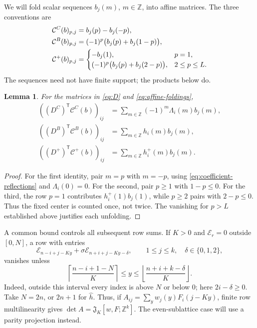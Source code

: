 \documentclass[12pt]{article}
\newtheorem{lemma}[theorem]{Lemma}
\numberwithin{equation}{section}
\newcommand{\Z}{\mathbb Z}
\newcommand{\Jaff}{\mathfrak J}
\begin{document}
We will fold scalar sequences $b_j(m)$, $m\in\Z$, into affine
matrices.  The three conventions are
\begin{align}
 \mathcal C^C(b)_{p,j}&=b_j(p)-b_j(-p),\notag\\
 \mathcal C^B(b)_{p,j}&=(-1)^p\bigl(b_j(p)+b_j(1-p)\bigr),
 \label{eq:affine-foldings}\\
 \mathcal C^+(b)_{p,j}&=
 \begin{cases}
 -b_j(1),&p=1,\\
 (-1)^p\bigl(b_j(p)+b_j(2-p)\bigr),&2\le p\le L.
 \end{cases}\notag
\end{align}
The sequences need not have finite support; the products below do.

\begin{lemma}
For the matrices in \eqref{eq:D} and \eqref{eq:affine-foldings},
\begin{align}
 ((D^C)^{\mathsf T}\mathcal C^C(b))_{ij}
 &=\sum_{m\in\Z}(-1)^m\Lambda_i(m)b_j(m),\label{eq:pairing-C}\\
 ((D^B)^{\mathsf T}\mathcal C^B(b))_{ij}
 &=\sum_{m\in\Z}h_i(m)b_j(m),\label{eq:pairing-B}\\
 ((D^+)^{\mathsf T}\mathcal C^+(b))_{ij}
 &=\sum_{m\in\Z}h_i^+(m)b_j(m).\label{eq:pairing-plus}
\end{align}
\end{lemma}

\begin{proof}
For the first identity, pair $m=p$ with $m=-p$, using
\eqref{eq:coefficient-reflections} and $\Lambda_i(0)=0$.
For the second, pair $p\ge1$ with $1-p\le0$.
For the third, the row $p=1$ contributes $h_i^+(1)b_j(1)$, while
$p\ge2$ pairs with $2-p\le0$.  Thus the fixed center is counted
once, not twice.  The vanishing for $p>L$ established above justifies
each unfolding.
\end{proof}

A common bound controls all subsequent row sums.  If $K>0$ and
$\mathcal E_r=0$ outside $[0,N]$, a row with entries
\[
 \mathcal E_{n-i+j-Ky}
       +\sigma\mathcal E_{n+i+j-Ky-\delta},
 \qquad 1\le j\le k,\quad \delta\in\{0,1,2\},
\]
vanishes unless
\[
 \left\lceil\frac{n-i+1-N}{K}\right\rceil
 \le y\le
 \left\lfloor\frac{n+i+k-\delta}{K}\right\rfloor.
\]
Indeed, outside this interval every index is above $N$ or below $0$;
here $2i-\delta\ge0$.  Take $N=2n$, or $2n+1$ for
$\widehat h$.  Thus, if $A_{ij}=\sum_y w_j(y)F_i(j-Ky)$, finite row
multilinearity gives $\det A=\Jaff_K[w,F;\Z^k]$.
The even-sublattice case will use a parity projection instead.
\end{document}
